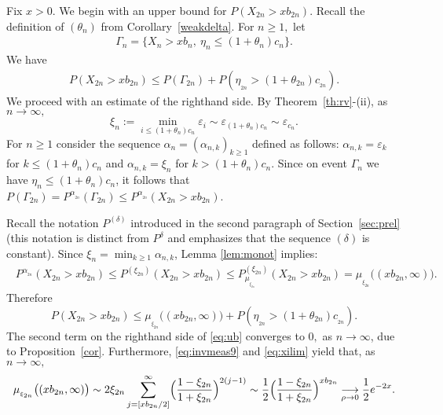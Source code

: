 \documentclass[12pt]{amsart}
\begin{document}
Fix $x>0.$ We begin with an upper bound for $P(X_{2n} > xb_{2n} ).$
Recall the definition of $(\theta_n)$ from
Corollary~\ref{weakdelta}. For $n\geq 1,$ let \begin{eqnarray*} \Gamma_n =\{X_n >
xb_n ,~\eta_n \leq (1+\theta_n) c_n\}. \end{eqnarray*} We have \begin{eqnarray*} P(X_{2n}
>xb_{2n}) \leq P(\Gamma_{2n})+P(\eta_{_{2n}}> (1+\theta_{2n}) c_{_{2n}}). \end{eqnarray*} We
proceed with an estimate of the righthand side. By
Theorem~\ref{th:rv}-(ii),  as $n\to\infty,$
\begin{equation}
\label{eq:xilim} \xi_n:=\min_{ i\le (1+\theta_n)c_n}{\varepsilon}_i \sim
{\varepsilon}_{(1+\theta_n)c_n}\sim {\varepsilon}_{c_{n}}.
\end{equation}
For $n\geq 1$ consider the sequence $\alpha_n=(\alpha_{n,k})_{k\ge 1}$
defined as follows: $\alpha_{n,k}= {\varepsilon}_k$ for $k \le (1+\theta_n)
c_n$ and $\alpha_{n,k} = \xi_n$ for $k> (1+\theta_n)c_n$.
Since on event $\Gamma_n$ we have $\eta_n \le (1+\theta_n)c_n$, it follows that
$P(\Gamma_{2n})=P^{\alpha_{_{2n}}}(\Gamma_{2n})\le P^{\alpha_{_{2n}}}(X_{2n} > xb_{2n})$.
\par
Recall the notation $P^{(\delta)}$ introduced in the second
paragraph of Section~\ref{sec:prel} (this notation is distinct from
$P^\delta$ and emphasizes that the sequence $(\delta)$ is constant).
Since $\xi_n = \min_{k \ge 1} \alpha_{n,k}$, Lemma \ref{lem:monot}
implies: \begin{eqnarray} \label{comp1} \ \ P^{\alpha_{_{2n}}}(X_{2n} >
xb_{2n})\le P^{(\xi_{2n})}(X_{2n} > xb_{2n})\le
P^{(\xi_{2n})}_{\mu_{_{\xi_{2n}}}}(X_{2n} >xb_{2n})=
\mu_{_{\xi_{2n}}}\bigl((xb_{2n},\infty)\bigr). \end{eqnarray} Therefore
\begin{equation}
\label{eq:ub} P(X_{2n} > xb_{2n}) \le \mu_{_{\xi_{2n}}}\bigl((xb_{2n},\infty)\bigr) + P(\eta_{_{2n}}>
(1+\theta_{2n})c_{_{2n}}).
\end{equation}
The second term on the righthand side of \eqref{eq:ub} converges to $0,$ as
$n\to\infty$, due to Proposition~\ref{cor}.
Furthermore, \eqref{eq:invmeas9} and \eqref{eq:xilim} yield that, as $n\to\infty,$
\begin{eqnarray}
\label{eq:lntail}
\mu_{_{\xi_{2n}}}\bigl((xb_{2n},\infty)\bigr)\sim  2 \xi_{2n}
\sum_{j=[xb_{2n}/2]}^{\infty}
\Bigl({\frac {\displaystyle {1-\xi_{2n}}}{\displaystyle {1+\xi_{2n}} }}\Bigr)^{2(j-1)}
\sim
{\frac {\displaystyle {1}}{\displaystyle {2} }} \Bigl({\frac {\displaystyle {1-\xi_{2n}}}{\displaystyle {1+\xi_{2n}} }}\Bigr)^{xb_{2n}} \underset{\rho \to 0}{\longrightarrow} {\frac {\displaystyle {1}}{\displaystyle {2} }}e^{-2x}.
\end{eqnarray}
\end{document}
